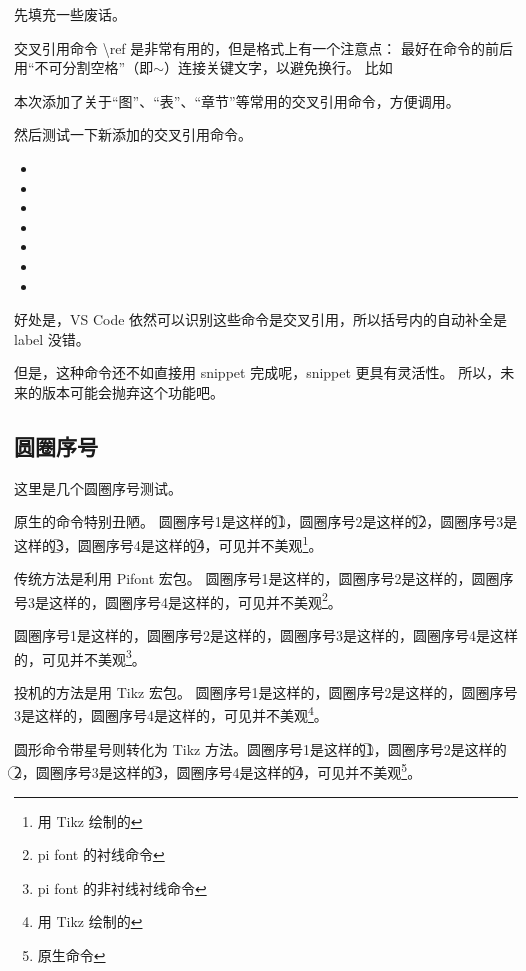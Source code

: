 \documentclass[../Main/thesis]{subfiles}
\begin{document}
先填充一些废话。\zhlipsum[10]

交叉引用命令 \textbackslash ref 是非常有用的，但是格式上有一个注意点：
最好在命令的前后用“不可分割空格”（即$\sim$）连接关键文字，以避免换行。
比如

本次添加了关于“图”、“表”、“章节”等常用的交叉引用命令，方便调用。

然后测试一下新添加的交叉引用命令。
\begin{itemize}[\textbullet]
  \item {}
  \item {}
  \item {}
  \item {}
  \item {}
  \item {}
  \item {}
\end{itemize}

好处是，VS Code 依然可以识别这些命令是交叉引用，所以括号内的自动补全是 label 没错。

但是，这种命令还不如直接用 snippet 完成呢，snippet 更具有灵活性。
所以，未来的版本可能会抛弃这个功能吧。

\subsection{圆圈序号}
这里是几个圆圈序号测试。

原生的命令特别丑陋。
圆圈序号1是这样的\textcircled{1}，圆圈序号2是这样的\textcircled{2}，圆圈序号3是这样的\textcircled{3}，圆圈序号4是这样的\textcircled{4}，可见并不美观\footnote{用 Tikz 绘制的}。

传统方法是利用 Pifont 宏包。
圆圈序号1是这样的，圆圈序号2是这样的，圆圈序号3是这样的，圆圈序号4是这样的，可见并不美观\footnote{pi font 的衬线命令}。

圆圈序号1是这样的，圆圈序号2是这样的，圆圈序号3是这样的，圆圈序号4是这样的，可见并不美观\footnote{pi font 的非衬线衬线命令}。

投机的方法是用 Tikz 宏包。
圆圈序号1是这样的，圆圈序号2是这样的，圆圈序号3是这样的，圆圈序号4是这样的，可见并不美观\footnote{用 Tikz 绘制的}。

圆形命令带星号则转化为 Tikz 方法。圆圈序号1是这样的\textcircled*{1}，圆圈序号2是这样的\textcircled*{2}，圆圈序号3是这样的\textcircled*{3}，圆圈序号4是这样的\textcircled*{4}，可见并不美观\footnote{原生命令}。
\end{document}
